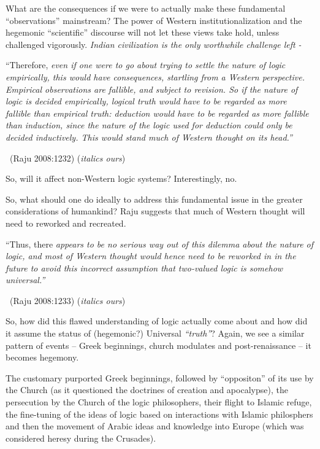 What are the consequences if we were to actually make these fundamental “observations” mainstream? The power of Western institutionalization and the hegemonic “scientific” discourse will not let these views take hold, unless challenged vigorously. \textit{Indian civilization is the only worthwhile challenge left -}

\begin{myquote}
“Therefore, \textit{even if one were to go about trying to settle the nature of logic empirically, this would have consequences, startling from a Western perspective. Empirical observations are fallible, and subject to revision. So if the nature of logic is decided empirically, logical truth would have to be regarded as more fallible than empirical truth: deduction would have to be regarded as more fallible than induction, since the nature of the logic used for deduction could only be decided inductively. This would stand much of Western thought on its head.”} 

~\hfill (Raju 2008:1232) (\textit{italics ours})
\end{myquote}

So, will it affect non-Western logic systems? Interestingly, no.

So, what should one do ideally to address this fundamental issue in the greater considerations of humankind? Raju suggests that much of Western thought will need to reworked and recreated.

\begin{myquote}
“Thus, there \textit{appears to be no serious way out of this dilemma about the nature of logic, and most of Western thought would hence need to be reworked in in the future to avoid this incorrect assumption that two-valued logic is somehow universal.”} 

\vskip -5pt

~\hfill (Raju 2008:1233) (\textit{italics ours})
\end{myquote}

So, how did this flawed understanding of logic actually come about and how did it assume the status of (hegemonic?) Universal \textit{“truth”}? Again, we see a similar pattern of events – Greek beginnings, church modulates and post-renaissance – it becomes hegemony.

The customary purported Greek beginnings, followed by “oppositon” of its use by the Church (as it questioned the doctrines of creation and apocalypse), the persecution by the Church of the logic philosophers, their flight to Islamic refuge, the fine-tuning of the ideas of logic based on interactions with Islamic philosphers and then the movement of Arabic ideas and knowledge into Europe (which was considered heresy during the Crusades).

